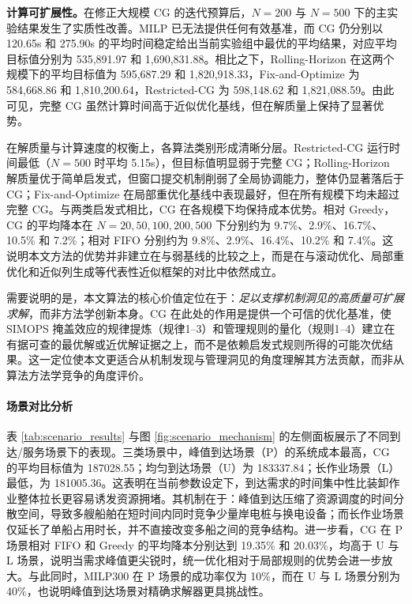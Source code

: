 \documentclass[UTF8, a4paper, 12pt]{ctexart}
\theoremstyle{plain}
\theoremstyle{definition}
\theoremstyle{remark}
\begin{document}
\textbf{计算可扩展性。}在修正大规模 CG 的迭代预算后，$N=200$ 与 $N=500$ 下的主实验结果发生了实质性改善。MILP 已无法提供任何有效基准，而 CG 仍分别以 120.65s 和 275.90s 的平均时间稳定给出当前实验组中最优的平均结果，对应平均目标值分别为 535{,}891.97 和 1{,}690{,}831.88。相比之下，Rolling-Horizon 在这两个规模下的平均目标值为 595{,}687.29 和 1{,}820{,}918.33，Fix-and-Optimize 为 584{,}668.86 和 1{,}810{,}200.64，Restricted-CG 为 598{,}148.62 和 1{,}821{,}088.59。由此可见，完整 CG 虽然计算时间高于近似优化基线，但在解质量上保持了显著优势。

在解质量与计算速度的权衡上，各算法类别形成清晰分层。Restricted-CG 运行时间最低（$N=500$ 时平均 5.15s），但目标值明显弱于完整 CG；Rolling-Horizon 解质量优于简单启发式，但窗口提交机制削弱了全局协调能力，整体仍显著落后于 CG；Fix-and-Optimize 在局部重优化基线中表现最好，但在所有规模下均未超过完整 CG。与两类启发式相比，CG 在各规模下均保持成本优势。相对 Greedy，CG 的平均降本在 $N=20,50,100,200,500$ 下分别约为 9.7\%、2.9\%、16.7\%、10.5\% 和 7.2\%；相对 FIFO 分别约为 9.8\%、2.9\%、16.4\%、10.2\% 和 7.4\%。这说明本文方法的优势并非建立在与弱基线的比较之上，而是在与滚动优化、局部重优化和近似列生成等代表性近似框架的对比中依然成立。

需要说明的是，本文算法的核心价值定位在于：\emph{足以支撑机制洞见的高质量可扩展求解}，而非方法学创新本身。CG 在此处的作用是提供一个可信的优化基准，使 SIMOPS 掩盖效应的规律提炼（规律1--3）和管理规则的量化（规则1--4）建立在有据可查的最优解或近优解证据之上，而不是依赖启发式规则所得的可能次优结果。这一定位使本文更适合从机制发现与管理洞见的角度理解其方法贡献，而非从算法方法学竞争的角度评价。

\begin{table}[htbp]
    \centering
    \caption{不同规模下各算法的总体对比结果}
    \label{tab:main_results}
    \scriptsize
    \setlength{\tabcolsep}{3pt}
    \renewcommand{\arraystretch}{1.08}
    \resizebox{\textwidth}{!}{}
\end{table}

\paragraph{场景对比分析}
表 \ref{tab:scenario_results} 与图 \ref{fig:scenario_mechanism} 的左侧面板展示了不同到达/服务场景下的表现。三类场景中，峰值到达场景（P）的系统成本最高，CG 的平均目标值为 187028.55；均匀到达场景（U）为 183337.84；长作业场景（L）最低，为 181005.36。这表明在当前参数设定下，到达需求的时间集中性比装卸作业整体拉长更容易诱发资源拥堵。其机制在于：峰值到达压缩了资源调度的时间分散空间，导致多艘船舶在短时间内同时竞争少量岸电桩与换电设备；而长作业场景仅延长了单船占用时长，并不直接改变多船之间的竞争结构。进一步看，CG 在 P 场景相对 FIFO 和 Greedy 的平均降本分别达到 19.35\% 和 20.03\%，均高于 U 与 L 场景，说明当需求峰值更尖锐时，统一优化相对于局部规则的优势会进一步放大。与此同时，MILP300 在 P 场景的成功率仅为 10\%，而在 U 与 L 场景分别为 40\%，也说明峰值到达场景对精确求解器更具挑战性。
\end{document}
